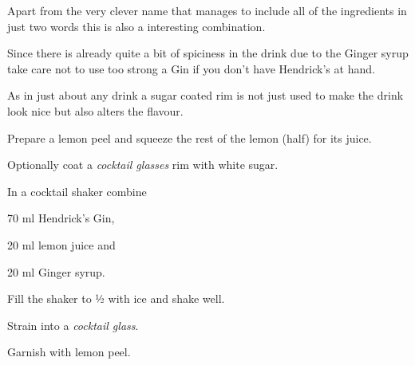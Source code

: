 \startsection[title={Lemon Gingerini},reference=lemongingerini]
Apart from the very clever name that manages to include all of the
ingredients in just two words this is also a interesting combination.

Since there is already quite a bit of spiciness in the drink due to the
Ginger syrup take care not to use too strong a Gin if you don't have
Hendrick's at hand.

As in just about any drink a sugar coated rim is not just used to make
the drink look nice but also alters the flavour.

\startitemize
\item Prepare a lemon peel and squeeze the rest of the lemon (half) for
      its juice.
\item Optionally coat a {\em cocktail glasses} rim with white sugar.
\item In a cocktail shaker combine
      \startitemize
      \item 70 ml Hendrick's Gin,
      \item 20 ml lemon juice and
      \item 20 ml Ginger syrup.
      \stopitemize
\item Fill the shaker to ½ with ice and shake well.
\item Strain into a {\em cocktail glass}.
\item Garnish with \tr lemon peel.
\stopitemize
